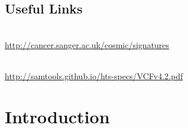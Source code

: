 
\subsection{Useful Links}

\begin{description}[style=multiline,labelindent=0cm,align=left,leftmargin=1cm]
 \item[Somatic Signatures web page] \hfill\\
  \url{http://cancer.sanger.ac.uk/cosmic/signatures}
 \item[Variant Call Format (VCF) specification] \hfill\\
  \url{http://samtools.github.io/hts-specs/VCFv4.2.pdf}
\end{description}

\newpage


\section{Introduction}

